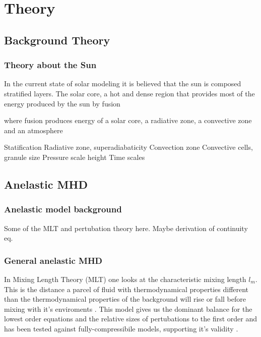 \chapter{Theory}
\section{Background Theory}
\subsection{Theory about the Sun}
In the current state of solar modeling it is believed that the sun is composed stratified layers. The solar core, a hot and dense region that provides most of the energy produced by the sun by fusion

\citep{1996Sci...272.1286C}


where fusion produces energy
of a solar core, a radiative zone, a convective zone and an atmosphere


Statification
Radiative zone, superadiabaticity
Convection zone
Convective cells, granule size
Pressure scale height
Time scales


\section{Anelastic MHD}
\subsection{Anelastic model background}
Some of the MLT and pertubation theory here. Maybe derivation of continuity eq.
\subsection{General anelastic MHD}

In Mixing Length Theory (MLT) one looks at the characteristic mixing length $l_m$. This is the distance a parcel of fluid with thermodynamical properties different than the thermodynamical properties of the background will rise or fall before mixing with it's enviroments \citep{1925ZaMM....5..136P}. This model gives us the dominant balance for the lowest order equations and the relative sizes of pertubations to the first order \citep{1999ApJS..121..247L} and has been tested against fully-compressibile models, supporting it's validity \citep{1989ApJ...336.1022C}. 

